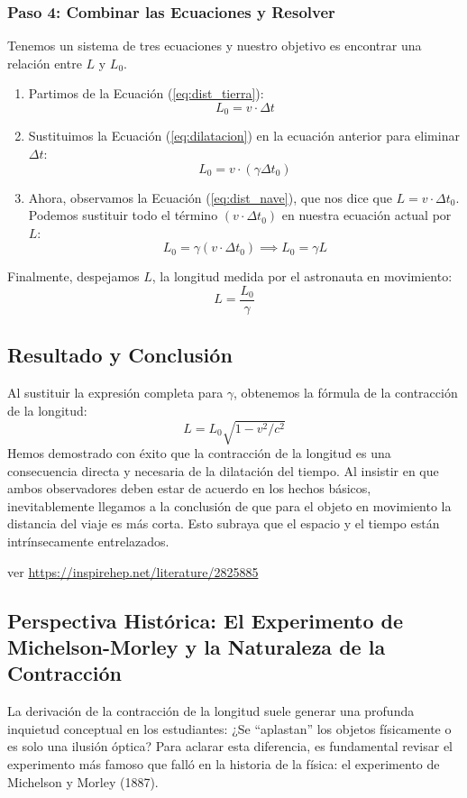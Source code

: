 \documentclass[11pt,a4paper]{book}
\begin{document}
\subsubsection*{Paso 4: Combinar las Ecuaciones y Resolver}
Tenemos un sistema de tres ecuaciones y nuestro objetivo es encontrar una relación entre $L$ y $L_0$.
\begin{enumerate}
    \item Partimos de la Ecuación (\ref{eq:dist_tierra}):
    \[ L_0 = v \cdot \Delta t \]
    \item Sustituimos la Ecuación (\ref{eq:dilatacion}) en la ecuación anterior para eliminar $\Delta t$:
    \[ L_0 = v \cdot (\gamma \Delta t_0) \]
    \item Ahora, observamos la Ecuación (\ref{eq:dist_nave}), que nos dice que $L = v \cdot \Delta t_0$. Podemos sustituir todo el término $(v \cdot \Delta t_0)$ en nuestra ecuación actual por $L$:
    \[ L_0 = \gamma (v \cdot \Delta t_0) \implies L_0 = \gamma L \]
\end{enumerate}
Finalmente, despejamos $L$, la longitud medida por el astronauta en movimiento:
\[ L = \frac{L_0}{\gamma} \]

\subsection*{Resultado y Conclusión}
Al sustituir la expresión completa para $\gamma$, obtenemos la fórmula de la contracción de la longitud:
\[ \boxed{ L = L_0 \sqrt{1 - v^2/c^2} } \]
Hemos demostrado con éxito que la contracción de la longitud es una consecuencia directa y necesaria de la dilatación del tiempo. Al insistir en que ambos observadores deben estar de acuerdo en los hechos básicos, inevitablemente llegamos a la conclusión de que para el objeto en movimiento la distancia del viaje es más corta. Esto subraya que el espacio y el tiempo están intrínsecamente entrelazados.


ver \url{https://inspirehep.net/literature/2825885}

\subsection{Perspectiva Histórica: El Experimento de Michelson-Morley y la Naturaleza de la Contracción}

La derivación de la contracción de la longitud suele generar una profunda inquietud conceptual en los estudiantes: ¿Se ``aplastan'' los objetos físicamente o es solo una ilusión óptica? Para aclarar esta diferencia, es fundamental revisar el experimento más famoso que falló en la historia de la física: el experimento de Michelson y Morley (1887).
\end{document}
